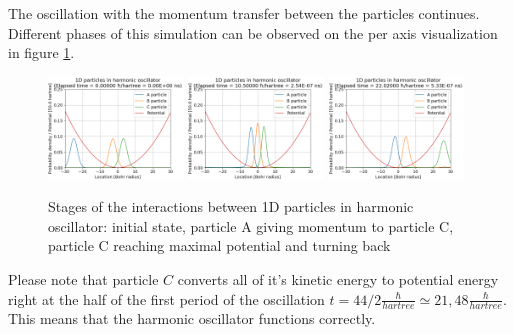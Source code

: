 The oscillation with the momentum transfer between the particles continues.
Different phases of this simulation can be observed on the per axis visualization in figure \ref{fig:1d_particles_in_oscillator_stages}.
\begin{figure}
	\begin{center}
		\includegraphics[width=0.32\textwidth]{figures/1d_oscillator_01.png}
		\includegraphics[width=0.32\textwidth]{figures/1d_oscillator_02.png}
		\includegraphics[width=0.32\textwidth]{figures/1d_oscillator_03.png}
		\caption{Stages of the interactions between 1D particles in harmonic oscillator: initial state, particle A giving momentum to particle C, particle C reaching maximal potential and turning back}
		\label{fig:1d_particles_in_oscillator_stages}
	\end{center}
\end{figure}
Please note that particle $C$ converts all of it's kinetic energy to potential energy right at the half of the first period of the oscillation $t = 44 / 2 \frac{\hbar}{hartree} \simeq 21,48 \frac{\hbar}{hartree}$.
This means that the harmonic oscillator functions correctly.

